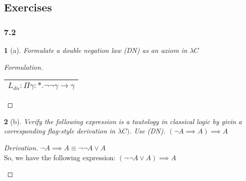 \documentclass[12pt, a4paper]{article}
\newtheorem*{exercise}{}
\begin{document}
\begin{flagderiv}
    \caption{A derivation of $\neg \exists_{x \in S}(P(x)) \implies \forall_{y \in S}(\neg P(y))$}
\end{flagderiv}

\subsection{Exercises}
\subsubsection{7.2}
\begin{exercise}[a]
    Formulate a double negation law (DN) as an axiom in $\lambda C$
\end{exercise}
\begin{proof}[Formulation]
    \begin{tabular}[]{|c|}
        \hline
        $L_{dn} : \Pi \gamma : *. \neg\neg\gamma \to \gamma$\\
        \hline
    \end{tabular}
\end{proof}

\begin{exercise}[b]
    Verify the following expression is a tautology in classical logic by givin a corresponding flag-style derivation in $\lambda C)$. Use (DN). $(\neg A \implies A) \implies A$
\end{exercise}
\begin{proof}[Derivation]
    $\neg A \implies A \equiv \neg \neg A \lor A$\\
    So, we have the following expression: $(\neg \neg A \lor A) \implies A$

    \begin{flagderiv}
    \end{flagderiv}
\end{proof}

\newpage


\end{document}
